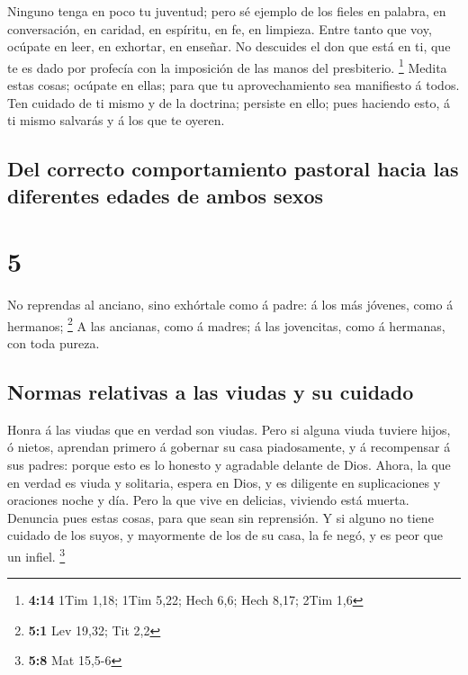  Ninguno tenga en poco tu juventud; pero sé ejemplo de los
fieles en palabra, en conversación, en caridad, en espíritu, en fe, en
limpieza.  Entre tanto que voy, ocúpate en leer, en
exhortar, en enseñar.  No descuides el don que está en ti,
que te es dado por profecía con la imposición de las manos del
presbiterio. \footnote{\textbf{4:14} 1Tim 1,18; 1Tim 5,22; Hech 6,6;
  Hech 8,17; 2Tim 1,6}  Medita estas cosas; ocúpate en
ellas; para que tu aprovechamiento sea manifiesto á todos. 
Ten cuidado de ti mismo y de la doctrina; persiste en ello; pues
haciendo esto, á ti mismo salvarás y á los que te oyeren.

\hypertarget{del-correcto-comportamiento-pastoral-hacia-las-diferentes-edades-de-ambos-sexos}{%
\subsection{Del correcto comportamiento pastoral hacia las diferentes
edades de ambos
sexos}\label{del-correcto-comportamiento-pastoral-hacia-las-diferentes-edades-de-ambos-sexos}}

\hypertarget{section-4}{%
\section{5}\label{section-4}}

 No reprendas al anciano, sino exhórtale como á padre: á los
más jóvenes, como á hermanos; \footnote{\textbf{5:1} Lev 19,32; Tit 2,2}
 A las ancianas, como á madres; á las jovencitas, como á
hermanas, con toda pureza.

\hypertarget{normas-relativas-a-las-viudas-y-su-cuidado}{%
\subsection{Normas relativas a las viudas y su
cuidado}\label{normas-relativas-a-las-viudas-y-su-cuidado}}

 Honra á las viudas que en verdad son viudas. 
Pero si alguna viuda tuviere hijos, ó nietos, aprendan primero á
gobernar su casa piadosamente, y á recompensar á sus padres: porque esto
es lo honesto y agradable delante de Dios.  Ahora, la que en
verdad es viuda y solitaria, espera en Dios, y es diligente en
suplicaciones y oraciones noche y día.  Pero la que vive en
delicias, viviendo está muerta.  Denuncia pues estas cosas,
para que sean sin reprensión.  Y si alguno no tiene cuidado
de los suyos, y mayormente de los de su casa, la fe negó, y es peor que
un infiel. \footnote{\textbf{5:8} Mat 15,5-6}

